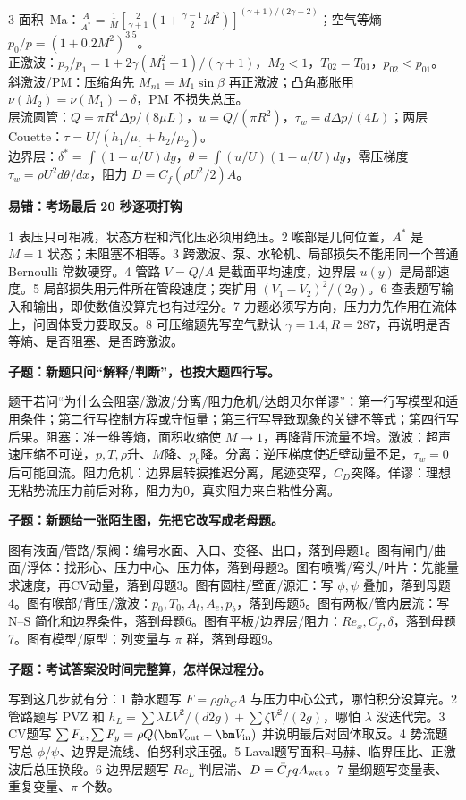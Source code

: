 \documentclass[a4paper]{article}
\newcommand{\qt}[1]{\vspace{0.04pt}\colorbox{Q}{\parbox{\dimexpr\linewidth-2\fboxsep}{\color{white}\bfseries #1}}\par}
\newcommand{\ans}[1]{\colorbox{G}{\parbox{\dimexpr\linewidth-2\fboxsep}{#1}}\par}
\begin{document}
\begin{multicols}{3}
{面积--Ma：$\displaystyle \frac{A}{A^*}=\frac{1}{M}\left[\frac{2}{\gamma+1}\left(1+\frac{\gamma-1}{2}M^2\right)\right]^{(\gamma+1)/(2\gamma-2)}$；空气等熵 $p_0/p=(1+0.2M^2)^{3.5}$。\\
正激波：$p_2/p_1=1+2\gamma(M_1^2-1)/(\gamma+1)$，$M_2<1$，$T_{02}=T_{01}$，$p_{02}<p_{01}$。\\
斜激波/PM：压缩角先 $M_{n1}=M_1\sin\beta$ 再正激波；凸角膨胀用 $\nu(M_2)=\nu(M_1)+\delta$，PM 不损失总压。\\
层流圆管：$Q=\pi R^4\Delta p/(8\mu L)$，$\bar u=Q/(\pi R^2)$，$\tau_w=d\Delta p/(4L)$；两层 Couette：$\tau=U/(h_1/\mu_1+h_2/\mu_2)$。\\
边界层：$\delta^*=\int(1-u/U)dy$，$\theta=\int(u/U)(1-u/U)dy$，零压梯度 $\tau_w=\rho U^2 d\theta/dx$，阻力 $D=C_f(\rho U^2/2)A$。}
\qt{易错：考场最后 20 秒逐项打钩}
\ans{1 表压只可相减，状态方程和汽化压必须用绝压。2 喉部是几何位置，$A^*$ 是 $M=1$ 状态；未阻塞不相等。3 跨激波、泵、水轮机、局部损失不能用同一个普通 Bernoulli 常数硬穿。4 管路 $V=Q/A$ 是截面平均速度，边界层 $u(y)$ 是局部速度。5 局部损失用元件所在管段速度；突扩用 $(V_1-V_2)^2/(2g)$。6 查表题写输入和输出，即使数值没算完也有过程分。7 力题必须写方向，压力力先作用在流体上，问固体受力要取反。8 可压缩题先写空气默认 $\gamma=1.4,R=287$，再说明是否等熵、是否阻塞、是否跨激波。}
\qt{子题：新题只问“解释/判断”，也按大题四行写。}
\ans{题干若问“为什么会阻塞/激波/分离/阻力危机/达朗贝尔佯谬”：第一行写模型和适用条件；第二行写控制方程或守恒量；第三行写导致现象的关键不等式；第四行写后果。阻塞：准一维等熵，面积收缩使 $M\to1$，再降背压流量不增。激波：超声速压缩不可逆，$p,T,\rho$升、$M$降、$p_0$降。分离：逆压梯度使近壁动量不足，$\tau_w=0$ 后可能回流。阻力危机：边界层转捩推迟分离，尾迹变窄，$C_D$突降。佯谬：理想无粘势流压力前后对称，阻力为0，真实阻力来自粘性分离。}
\qt{子题：新题给一张陌生图，先把它改写成老母题。}
\ans{图有液面/管路/泵阀：编号水面、入口、变径、出口，落到母题1。图有闸门/曲面/浮体：找形心、压力中心、压力体，落到母题2。图有喷嘴/弯头/叶片：先能量求速度，再CV动量，落到母题3。图有圆柱/壁面/源汇：写 $\phi,\psi$ 叠加，落到母题4。图有喉部/背压/激波：$p_0,T_0,A_t,A_e,p_b$，落到母题5。图有两板/管内层流：写 N--S 简化和边界条件，落到母题6。图有平板/边界层/阻力：$Re_x,C_f,\delta$，落到母题7。图有模型/原型：列变量与 $\pi$ 群，落到母题9。}
\qt{子题：考试答案没时间完整算，怎样保过程分。}
\ans{写到这几步就有分：1 静水题写 $F=\rho gh_CA$ 与压力中心公式，哪怕积分没算完。2 管路题写 PVZ 和 $h_L=\sum\lambda L V^2/(d2g)+\sum\zeta V^2/(2g)$，哪怕 $\lambda$ 没迭代完。3 CV题写 $\sum F_x,\sum F_y=\rho Q(\bm V_{\rm out}-\bm V_{\rm in})$ 并说明最后对固体取反。4 势流题写总 $\phi/\psi$、边界是流线、伯努利求压强。5 Laval题写面积--马赫、临界压比、正激波后总压换段。6 边界层题写 $Re_L$ 判层湍、$D=\bar C_f qA_{\rm wet}$。7 量纲题写变量表、重复变量、$\pi$ 个数。}

\end{multicols}
\end{document}
